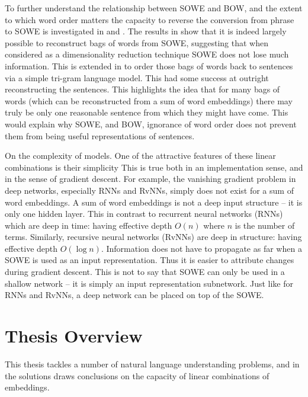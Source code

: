 \documentclass{book}
\begin{document}
To further understand the relationship between SOWE and BOW, and the extent to which word order matters the capacity to reverse the conversion from phrase to SOWE is investigated in  and .
The results in  show that it is indeed largely possible to reconstruct bags of words from SOWE, suggesting that when considered as a dimensionality reduction technique SOWE does not lose much information.
This is extended in  to order those bags of words back to sentences via a simple tri-gram language model.
This had some success at outright reconstructing the sentences.
This highlights the idea that for many  bags of words (which can be reconstructed from a sum of word embeddings) there may truly be only one reasonable sentence from which they might have come.
This would explain why SOWE, and BOW, ignorance of word order does not prevent them from being useful representations of sentences.


On the complexity of models.
One of the attractive features of these linear combinations is their simplicity
This is true both in an implementation sense, and in the sense of gradient descent.
For example, the vanishing gradient problem in deep networks, especially RNNs and RvNNs,
simply does not exist for a sum of word embeddings.
A sum of word embeddings is not a deep input structure -- it is only one hidden layer.
This in contrast to recurrent neural networks (RNNs) which are deep in time: having effective depth $O(n)$ where $n$ is the number of terms.
Similarly, recursive neural networks (RvNNs) are deep in structure: having effective depth $O(\log n)$.
Information does not have to propagate as far when a SOWE is used as an input representation.
Thus it is easier to attribute changes during gradient descent.
This is not to say that SOWE can only be used in a shallow network -- it is simply an input representation subnetwork.
Just like for RNNs and RvNNs, a deep network can be placed on top of the SOWE.


\section{Thesis Overview}
This thesis tackles a number of natural language understanding problems, and in the solutions draws conclusions on the capacity of linear combinations of embeddings.
\end{document}
